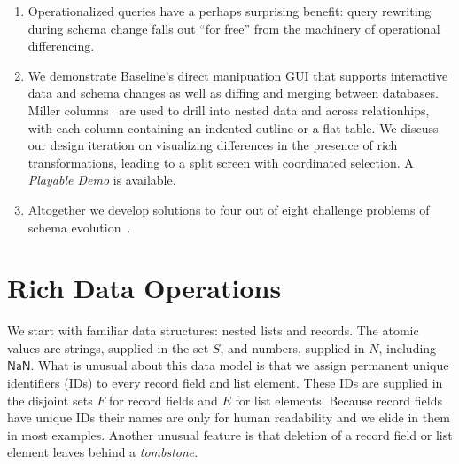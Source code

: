 \documentclass[english,submission]{programming}
\theoremstyle{definition}
\newcommand{\mathbox}[1]{\colorbox{black!10}{$#1$}}
\begin{document}
\begin{enumerate}
\item Operationalized queries have a perhaps surprising benefit: query rewriting~\cite{curino08, herrmann17} during schema change falls out ``for free'' from the machinery of operational differencing.

\item We demonstrate Baseline's direct manipuation GUI that supports interactive data and schema changes as well as diffing and merging between databases.
Miller columns~\cite{miller-columns} are used to drill into nested data and across relationhips, with each column containing an indented outline or a flat table. We discuss our design iteration on visualizing differences in the presence of rich transformations, leading to a split screen with coordinated selection. A \textit{Playable Demo} is available.

\item Altogether we develop solutions to four out of eight challenge problems of schema evolution~\cite{challenge-problems}.

\end{enumerate}







\section{Rich Data Operations}\label{rich-data}

We start with familiar data structures: nested lists and records. The atomic values are strings, supplied in the set \mathbox{S}, and numbers, supplied in \mathbox{N}, including \mathbox{\textsf{NaN}}. What is unusual about this data model is that we assign permanent unique identifiers (IDs) to every record field and list element. These IDs are supplied in the disjoint sets \mathbox{F} for record fields and \mathbox{E} for list elements. Because record fields have unique IDs their names are only for human readability and we elide in them in most examples. Another unusual feature is that deletion of a record field or list element leaves behind a \textit{tombstone}.
\end{document}
